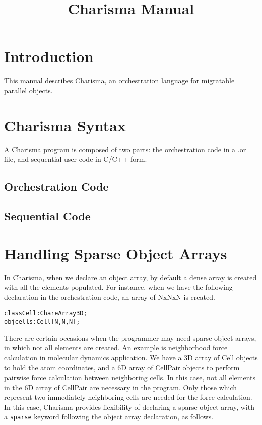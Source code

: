 \documentclass[10pt]{article}
\title{Charisma Manual}
\def\code#1{{\small {\tt {#1}}}}
\begin{document}
\maketitle

\section{Introduction}

This manual describes Charisma, an orchestration language for migratable
parallel objects. 

\section{Charisma Syntax}
A Charisma program is composed of two parts: the orchestration code in a .or
file, and sequential user code in C/C++ form. 

\subsection{Orchestration Code}


\subsection{Sequential Code}
\label{sec:sequential}


\section{Handling Sparse Object Arrays}
\label{sec:sparse}

In Charisma, when we declare an object array, by default a dense array is
created with all the elements populated. For instance, when we have the
following declaration in the orchestration code, an array of NxNxN is created. 
\begin{alltt}
    class Cell : ChareArray3D;
    obj cells : Cell[N,N,N];
\end{alltt}

There are certain occasions when the programmer may need sparse object arrays,
in which not all elements are created. An example is neighborhood force
calculation in molecular dynamics application. We have a 3D array of Cell
objects to hold the atom coordinates, and a 6D array of CellPair objects to
perform pairwise force calculation between neighboring cells. In this case, not
all elements in the 6D array of CellPair are necessary in the program. Only
those which represent two immediately neighboring cells are needed for the
force calculation. In this case, Charisma provides flexibility of declaring a
sparse object array, with a \code{sparse} keyword following the object array
declaration, as follows.
\end{document}
